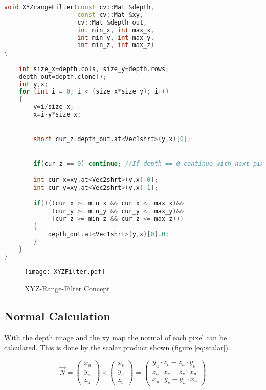 \begin{lstlisting}[caption={XYZrangeFilter - Function\label{lst:range3d}},language=C++]
void XYZrangeFilter(const cv::Mat &depth, 
                    const cv::Mat &xy, 
                    cv::Mat &depth_out, 
                    int min_x, int max_x, 
                    int min_y, int max_y, 
                    int min_z, int max_z)
{

	int size_x=depth.cols, size_y=depth.rows;
	depth_out=depth.clone();
	int y,x;
	for (int i = 0; i < (size_x*size_y); i++)
	{
		y=i/size_x;
		x=i-y*size_x;


		short cur_z=depth_out.at<Vec1shrt>(y,x)[0];


		if(cur_z == 0) continue; //If depth == 0 continue with next pixel

		int cur_x=xy.at<Vec2shrt>(y,x)[0];
		int cur_y=xy.at<Vec2shrt>(y,x)[1];

		if(!((cur_x >= min_x && cur_x <= max_x)&&
		     (cur_y >= min_y && cur_y <= max_y)&&
		     (cur_z >= min_z && cur_z <= max_z)))
		{
			depth_out.at<Vec1shrt>(y,x)[0]=0;
		}
	}
}
\end{lstlisting}


\begin{figure}[H]
\begin{center}
  \texttt{[image: XYZFilter.pdf]}
  \caption{XYZ-Range-Filter Concept}
  \label{figure:xyzrange}
\end{center}
\end{figure}


\subsection{Normal Calculation}
With the depth image and the xy map the normal of each pixel can be calculated. This is done by the scalar product
shown (figure \vref{eq:scalar}).

\begin{equation}
 \vec{N} =        \left( \begin{array}{c} x_u                           \\                           y_u \\ z_u                           \end{array} \right) 
           \times \left( \begin{array}{c} x_v                           \\                           y_v \\ z_v                           \end{array} \right) 
         =        \left( \begin{array}{c} y_u \cdot z_v - z_u \cdot y_v \\ z_u \cdot x_v - z_v \cdot x_u \\ x_u \cdot y_v - y_u \cdot x_v \end{array}\right)
\label{eq:scalar}
\end{equation}


